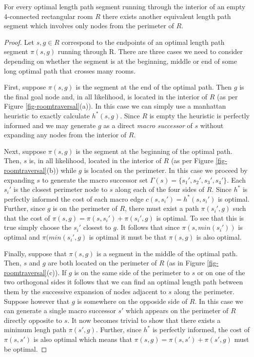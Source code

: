 \begin{mylemma}
\label{thm-roomtraversal}
For every optimal length path segment running through the interior of an empty 
4-connected rectangular room $R$ there exists another equivalent length path 
segment which involves only nodes from the perimeter of $R$.
\end{mylemma}
\begin{proof}
Let $s, g \in R$ correspond to the endpoints of an optimal length path segment 
$\pi(s, g)$ running through R.
There are three cases we need to consider depending on whether the segment 
is at the beginning, middle or end of some long optimal path that crosses
many rooms.
\par
First, suppose $\pi(s, g)$ is the segment at the end of the optimal path.
Then $g$ is the final goal node and, in all likelihood, is located in the 
interior of $R$ (as per Figure \ref{fig-roomtraversal}(a)).
In this case we can simply use a manhattan heuristic to exactly calculate $h^*(s, g)$.
Since $R$ is empty the heuristic is perfectly informed and we may generate $g$
as a direct \emph{macro successor} of $s$ without expanding any nodes from the interior of $R$.
\par
Next, suppose $\pi(s, g)$ is the segment at the beginning of the optimal path. 
Then, $s$ is, in all likelihood, located in the interior of $R$ 
(as per Figure \ref{fig-roomtraversal}(b)) while $g$ is located on the perimeter.
In this case we proceed by expanding $s$ to generate the macro successor set 
$\Gamma(s) = \lbrace s_{1}', s_{2}', s_{3}', s_{4}'\rbrace$.
Each $s_{i}'$ is the closest perimeter node to $s$ along each of the four sides of $R$.
Since $h^*$ is perfectly informed the cost of each macro edge 
$c(s, s_{i}') = h^*(s, s_{i}')$ is optimal.
Further, since $g$ is on the perimeter of $R$, there must exist a path $\pi(s_{i}', g)$ 
such that the cost of $\pi(s, g) = \pi(s, s_{i}') + \pi(s_{i}', g)$ is optimal.
To see that this is true simply choose the $s_{i}'$ closest to $g$.
It follows that since $\pi(s, min(s_{i}'))$ is optimal and $\pi(min(s_{i}', g)$
is optimal it must be that $\pi(s, g)$ is also optimal. 
\par
Finally, suppose that $\pi(s, g)$ is a segment in the middle of the optimal path.
Then, $s$ and $g$ are both located on the perimeter of $R$ 
(as in Figure \ref{fig-roomtraversal}(c)). 
If $g$ is on the same side of the perimeter to $s$ or on one of the two orthogonal sides 
it follows that we can find an optimal length path between them by the successive expansion of 
nodes adjacent to $s$ along the perimeter.
Suppose however that $g$ is somewhere on the opposide side of $R$.
In this case we can generate a single macro successor $s'$ which appears on the 
perimeter of $R$ directly opposite to $s$.
It now becomes trivial to show that there exists a minimum lengh path $\pi(s',g)$.
Further, since $h^*$ is perfectly informed, the cost of $\pi(s, s')$ is also optimal
which means that $\pi(s, g) = \pi(s, s') + \pi(s', g)$ must be optimal.
\end{proof}

